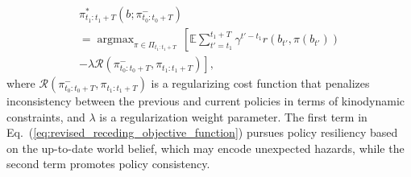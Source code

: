 \documentclass[letterpaper]{article} %
\newcommand{\argmax}{\mathop{\mathrm{argmax}}}
\begin{document}
%
\begin{multline}
  \pi_{t_1:t_1+T}^*(b; \pi_{t_0:t_0+T}^-) 
  \\
  = \argmax_{\pi \in \Pi_{t_1:t_1+T}} \, \left[ \mathbb{E} \sum_{t'=t_1}^{t_1+T} \gamma^{t'-t_1} r(b_{t'}, \pi(b_{t'})) \right.
  \\
   \left. - \lambda \mathcal{R}(\pi_{t_0:t_0+T}^-, \pi_{t_1:t_1+T}) \right],
  \label{eq:revised_receding_objective_function}
\end{multline}
where $\mathcal{R}(\pi_{t_0:t_0+T}^-, \pi_{t_1:t_1+T})$ is a regularizing cost function that penalizes inconsistency between the previous and current policies in terms of kinodynamic constraints, and $\lambda$ is a regularization weight parameter.
The first term in Eq.~(\ref{eq:revised_receding_objective_function}) pursues policy resiliency based on the up-to-date world belief, which may encode unexpected hazards, while the second term promotes policy consistency.
\end{document}
